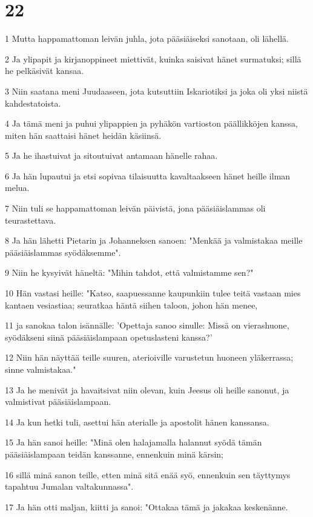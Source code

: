 \chapter{22}

\par 1 Mutta happamattoman leivän juhla, jota pääsiäiseksi sanotaan, oli lähellä.
\par 2 Ja ylipapit ja kirjanoppineet miettivät, kuinka saisivat hänet surmatuksi; sillä he pelkäsivät kansaa.
\par 3 Niin saatana meni Juudaaseen, jota kutsuttiin Iskariotiksi ja joka oli yksi niistä kahdestatoista.
\par 4 Ja tämä meni ja puhui ylipappien ja pyhäkön vartioston päällikköjen kanssa, miten hän saattaisi hänet heidän käsiinsä.
\par 5 Ja he ihastuivat ja sitoutuivat antamaan hänelle rahaa.
\par 6 Ja hän lupautui ja etsi sopivaa tilaisuutta kavaltaakseen hänet heille ilman melua.
\par 7 Niin tuli se happamattoman leivän päivistä, jona pääsiäislammas oli teurastettava.
\par 8 Ja hän lähetti Pietarin ja Johanneksen sanoen: "Menkää ja valmistakaa meille pääsiäislammas syödäksemme".
\par 9 Niin he kysyivät häneltä: "Mihin tahdot, että valmistamme sen?"
\par 10 Hän vastasi heille: "Katso, saapuessanne kaupunkiin tulee teitä vastaan mies kantaen vesiastiaa; seuratkaa häntä siihen taloon, johon hän menee,
\par 11 ja sanokaa talon isännälle: 'Opettaja sanoo sinulle: Missä on vierashuone, syödäkseni siinä pääsiäislampaan opetuslasteni kanssa?'
\par 12 Niin hän näyttää teille suuren, aterioiville varustetun huoneen yläkerrassa; sinne valmistakaa."
\par 13 Ja he menivät ja havaitsivat niin olevan, kuin Jeesus oli heille sanonut, ja valmistivat pääsiäislampaan.
\par 14 Ja kun hetki tuli, asettui hän aterialle ja apostolit hänen kanssansa.
\par 15 Ja hän sanoi heille: "Minä olen halajamalla halannut syödä tämän pääsiäislampaan teidän kanssanne, ennenkuin minä kärsin;
\par 16 sillä minä sanon teille, etten minä sitä enää syö, ennenkuin sen täyttymys tapahtuu Jumalan valtakunnassa".
\par 17 Ja hän otti maljan, kiitti ja sanoi: "Ottakaa tämä ja jakakaa keskenänne.
